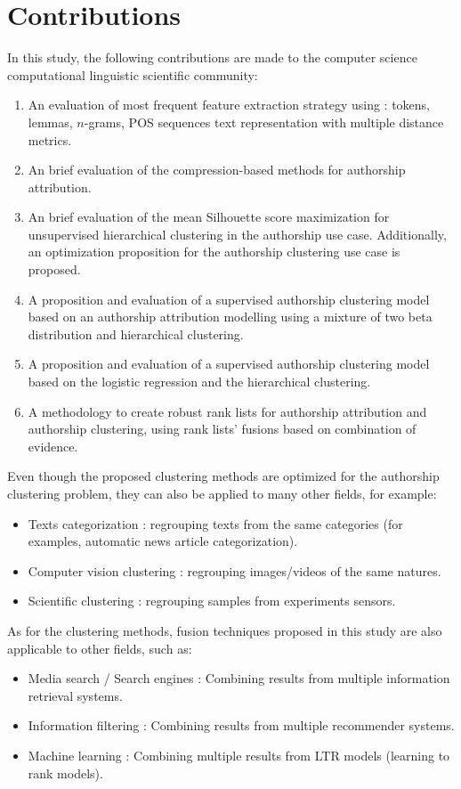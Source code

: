 \section{Contributions}

In this study, the following contributions are made to the computer science computational linguistic scientific community:

\begin{enumerate}
  \item
  An evaluation of most frequent feature extraction strategy using : tokens, lemmas, $n$-grams, POS sequences text representation with multiple distance metrics.
  \item
  An brief evaluation of the compression-based methods for authorship attribution.
  \item
  An brief evaluation of the mean Silhouette score maximization for unsupervised hierarchical clustering in the authorship use case. Additionally, an optimization proposition for the authorship clustering use case is proposed.
  \item
  A proposition and evaluation of a supervised authorship clustering model based on an authorship attribution modelling using a mixture of two beta distribution and hierarchical clustering.
  \item
  A proposition and evaluation of a supervised authorship clustering model based on the logistic regression and the hierarchical clustering.
  \item
  A methodology to create robust rank lists for authorship attribution and authorship clustering, using rank lists' fusions based on combination of evidence.
\end{enumerate}

Even though the proposed clustering methods are optimized for the authorship clustering problem, they can also be applied to many other fields, for example:
\begin{itemize}
  \item
  Texts categorization : regrouping texts from the same categories (for examples, automatic news article categorization).
  \item
  Computer vision clustering : regrouping images/videos of the same natures.
  \item
  Scientific clustering : regrouping samples from experiments sensors.
\end{itemize}

As for the clustering methods, fusion techniques proposed in this study are also applicable to other fields, such as:
\begin{itemize}
  \item
  Media search / Search engines : Combining results from multiple information retrieval systems.
  \item
  Information filtering : Combining results from multiple recommender systems.
  \item
  Machine learning : Combining multiple results from LTR models (learning to rank models).
\end{itemize}
